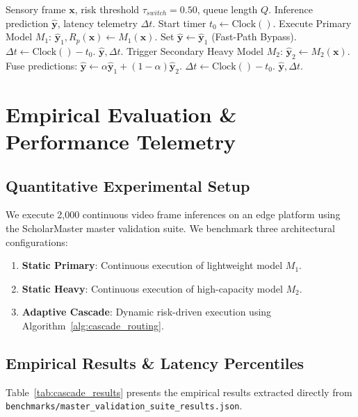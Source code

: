\documentclass[conference]{IEEEtran}
\begin{document}
\begin{algorithm}[t]
\caption{Adaptive Risk-Driven Edge Cascade Routing}
\label{alg:cascade_routing}
\begin{algorithmic}[1]
\REQUIRE Sensory frame $\mathbf{x}$, risk threshold $\tau_{switch} = 0.50$, queue length $Q$.
\ENSURE Inference prediction $\hat{\mathbf{y}}$, latency telemetry $\Delta t$.
\STATE Start timer $t_0 \leftarrow \mathrm{Clock}()$.
\STATE Execute Primary Model $M_1$: $\hat{\mathbf{y}}_1, R_p(\mathbf{x}) \leftarrow M_1(\mathbf{x})$.
    \STATE Set $\hat{\mathbf{y}} \leftarrow \hat{\mathbf{y}}_1$ (Fast-Path Bypass).
    \STATE $\Delta t \leftarrow \mathrm{Clock}() - t_0$.
    \RETURN $\hat{\mathbf{y}}, \Delta t$.
\ELSE
    \STATE Trigger Secondary Heavy Model $M_2$: $\hat{\mathbf{y}}_2 \leftarrow M_2(\mathbf{x})$.
    \STATE Fuse predictions: $\hat{\mathbf{y}} \leftarrow \alpha \hat{\mathbf{y}}_1 + (1 - \alpha) \hat{\mathbf{y}}_2$.
    \STATE $\Delta t \leftarrow \mathrm{Clock}() - t_0$.
    \RETURN $\hat{\mathbf{y}}, \Delta t$.
\ENDIF
\end{algorithmic}
\end{algorithm}

\section{Empirical Evaluation \& Performance Telemetry}
\subsection{Quantitative Experimental Setup}
We execute 2,000 continuous video frame inferences on an edge platform using the ScholarMaster master validation suite. We benchmark three architectural configurations:
\begin{enumerate}
    \item \textbf{Static Primary}: Continuous execution of lightweight model $M_1$.
    \item \textbf{Static Heavy}: Continuous execution of high-capacity model $M_2$.
    \item \textbf{Adaptive Cascade}: Dynamic risk-driven execution using Algorithm~\ref{alg:cascade_routing}.
\end{enumerate}

\subsection{Empirical Results \& Latency Percentiles}
Table~\ref{tab:cascade_results} presents the empirical results extracted directly from \texttt{benchmarks/master\_validation\_suite\_results.json}.
\end{document}
